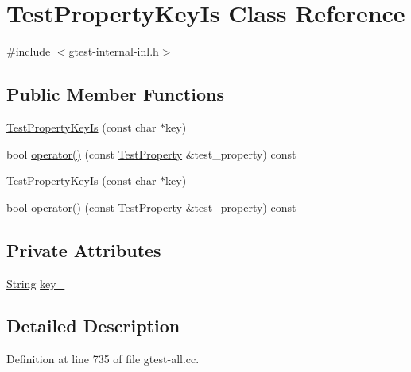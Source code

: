 \hypertarget{classtesting_1_1internal_1_1TestPropertyKeyIs}{\section{\-Test\-Property\-Key\-Is \-Class \-Reference}
\label{d1/d6f/classtesting_1_1internal_1_1TestPropertyKeyIs}
}


{\ttfamily \#include $<$gtest-\/internal-\/inl.\-h$>$}

\subsection*{\-Public \-Member \-Functions}
\begin{DoxyCompactItemize}
\item 
\hyperlink{classtesting_1_1internal_1_1TestPropertyKeyIs_a53dffadd80b0ce39f5de2fa0c7246d9d}{\-Test\-Property\-Key\-Is} (const char $\ast$key)
\item 
bool \hyperlink{classtesting_1_1internal_1_1TestPropertyKeyIs_a92885f50d2b646718e347767f165b30d}{operator()} (const \hyperlink{classtesting_1_1TestProperty}{\-Test\-Property} \&test\-\_\-property) const 
\item 
\hyperlink{classtesting_1_1internal_1_1TestPropertyKeyIs_a53dffadd80b0ce39f5de2fa0c7246d9d}{\-Test\-Property\-Key\-Is} (const char $\ast$key)
\item 
bool \hyperlink{classtesting_1_1internal_1_1TestPropertyKeyIs_a92885f50d2b646718e347767f165b30d}{operator()} (const \hyperlink{classtesting_1_1TestProperty}{\-Test\-Property} \&test\-\_\-property) const 
\end{DoxyCompactItemize}
\subsection*{\-Private \-Attributes}
\begin{DoxyCompactItemize}
\item 
\hyperlink{classtesting_1_1internal_1_1String}{\-String} \hyperlink{classtesting_1_1internal_1_1TestPropertyKeyIs_afdc9c0d8472fabfa4466b1a0eb0d0ff2}{key\-\_\-}
\end{DoxyCompactItemize}


\subsection{\-Detailed \-Description}


\-Definition at line 735 of file gtest-\/all.\-cc.



